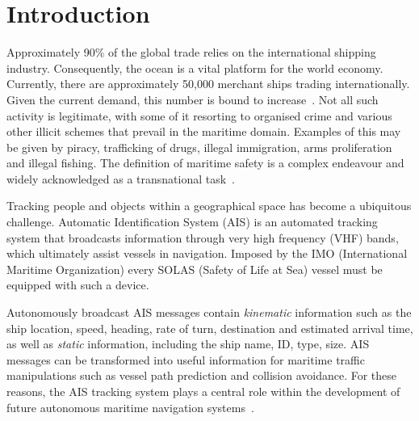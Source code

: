\chapter{Introduction}
\label{chapter:introduction}


Approximately 90\% of the global trade relies on the international shipping industry. Consequently, the ocean is a vital platform for the world economy.
Currently, there are approximately 50,000 merchant ships trading internationally. Given the current demand, this number is bound to increase~\cite{ICS}. Not all such activity is legitimate, with some of it resorting to organised crime and various other illicit schemes that prevail in the maritime domain. Examples of this may be given by piracy, trafficking of drugs, illegal immigration, arms proliferation and illegal fishing. The definition of maritime safety is a complex endeavour and widely acknowledged as a transnational task~\cite{Bueger2015}.

Tracking people and objects within a geographical space has become a ubiquitous challenge. Automatic Identification System (AIS)\label{label_AIS} is an automated tracking system that broadcasts information through very high frequency (VHF) bands, which ultimately assist vessels in navigation. Imposed by the IMO (International Maritime Organization)\label{label_IMO} every SOLAS
(Safety of Life at Sea) \label{label_SOLAS} vessel must be equipped with such a device.

Autonomously broadcast AIS messages contain \emph{kinematic} information such as the ship location, speed, heading, rate of turn, destination and estimated arrival time, as well as \emph{static} information, including the ship name, ID, type, size. AIS messages can be transformed into useful information for maritime traffic manipulations such as vessel path prediction and collision avoidance. For these reasons, the AIS tracking system plays a central role within the development of future autonomous maritime navigation systems~\cite{Mao2016}.

